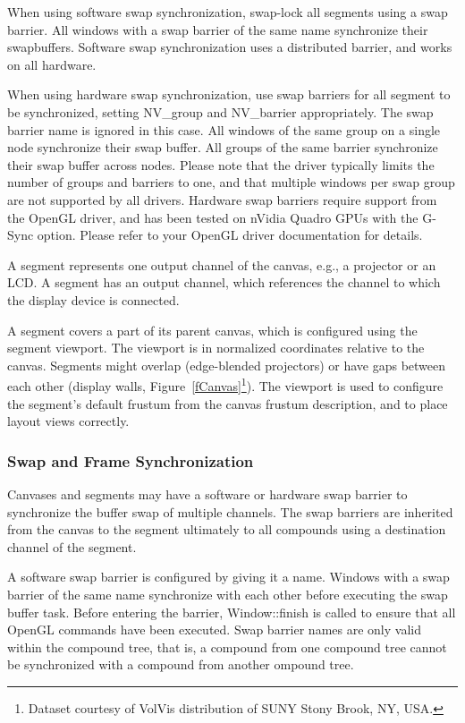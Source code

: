 \documentclass[10pt,a4]{scrartcl}
\newcommand{\fig}[1]{Figure~\ref{#1}}
\begin{document}
When using software swap synchronization, swap-lock all segments using a swap
barrier. All windows with a swap barrier of the same name synchronize their
swapbuffers. Software swap synchronization uses a distributed barrier, and works
on all hardware.

When using hardware swap synchronization, use swap barriers for all segment to
be synchronized, setting \textsf{NV\_group} and \textsf{NV\_barrier}
appropriately. The swap barrier name is ignored in this case. All windows of the
same group on a single node synchronize their swap buffer. All groups of the
same barrier synchronize their swap buffer across nodes. Please note that the
driver typically limits the number of groups and barriers to one, and that
multiple windows per swap group are not supported by all drivers. Hardware swap
barriers require support from the OpenGL driver, and has been tested on nVidia
Quadro GPUs with the G-Sync option. Please refer to your OpenGL driver
documentation for details.

A segment represents one output channel of the canvas, e.g., a projector
or an LCD. A segment has an output channel, which references the channel to
which the display device is connected.

A segment covers a part of its parent canvas, which is configured using the
segment viewport. The viewport is in normalized coordinates relative to the
canvas. Segments might overlap (edge-blended projectors) or have gaps between
each other (display walls, \fig{fCanvas}\footnote{Dataset courtesy of VolVis
  distribution of SUNY Stony Brook, NY, USA.}). The viewport is used to
configure the segment's default frustum from the canvas frustum description, and
to place layout views correctly.

\subsubsection{\label{sSwapBarrier}Swap and Frame Synchronization}
Canvases and segments may have a software or hardware swap barrier to
synchronize the buffer swap of multiple channels. The swap barriers are
inherited from the canvas to the segment ultimately to all compounds using a
destination channel of the segment.

A software swap barrier is configured by giving it a name. Windows with a swap
barrier of the same name synchronize with each other before executing the swap
buffer task. Before entering the barrier, \textsf{Window::finish} is called to
ensure that all OpenGL commands have been executed.  Swap barrier names are only
valid within the compound tree, that is, a compound from one compound tree
cannot be synchronized with a compound from another ompound tree.
\end{document}
